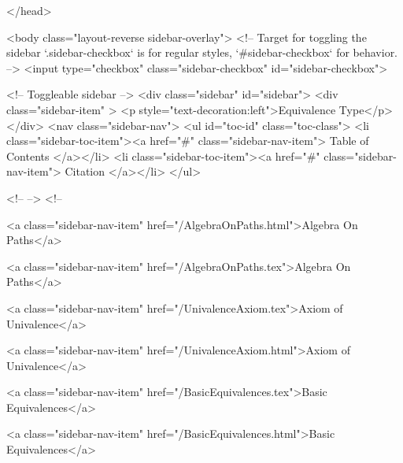   
</head>




  <body class="layout-reverse sidebar-overlay">
    <!-- Target for toggling the sidebar `.sidebar-checkbox` is for regular
     styles, `#sidebar-checkbox` for behavior. -->
<input type="checkbox" class="sidebar-checkbox" id="sidebar-checkbox">

<!-- Toggleable sidebar -->
<div class="sidebar" id="sidebar">
  <div class="sidebar-item" >
    <p style="text-decoration:left">Equivalence Type</p>
  </div>
  <nav class="sidebar-nav">
    <ul id="toc-id" class="toc-class">
  <li class="sidebar-toc-item"><a href="#" class="sidebar-nav-item"> Table of Contents </a></li>
  <li class="sidebar-toc-item"><a href="#" class="sidebar-nav-item"> Citation </a></li>
</ul>


    <!--  -->
    <!-- 
      
    
      
    
      
    
      
    
      
        
      
    
      
        
          <a class="sidebar-nav-item" href="/AlgebraOnPaths.html">Algebra On Paths</a>
        
      
    
      
        
          <a class="sidebar-nav-item" href="/AlgebraOnPaths.tex">Algebra On Paths</a>
        
      
    
      
        
          <a class="sidebar-nav-item" href="/UnivalenceAxiom.tex">Axiom of Univalence</a>
        
      
    
      
        
          <a class="sidebar-nav-item" href="/UnivalenceAxiom.html">Axiom of Univalence</a>
        
      
    
      
        
          <a class="sidebar-nav-item" href="/BasicEquivalences.tex">Basic Equivalences</a>
        
      
    
      
        
          <a class="sidebar-nav-item" href="/BasicEquivalences.html">Basic Equivalences</a>
        

